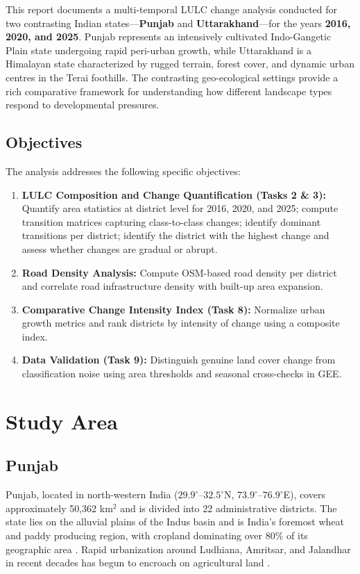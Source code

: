 \documentclass[12pt,a4paper]{article}
\begin{document}
This report documents a multi-temporal LULC change analysis conducted for two contrasting Indian states---\textbf{Punjab} and \textbf{Uttarakhand}---for the years \textbf{2016, 2020, and 2025}. Punjab represents an intensively cultivated Indo-Gangetic Plain state undergoing rapid peri-urban growth, while Uttarakhand is a Himalayan state characterized by rugged terrain, forest cover, and dynamic urban centres in the Terai foothills. The contrasting geo-ecological settings provide a rich comparative framework for understanding how different landscape types respond to developmental pressures.

\subsection{Objectives}
The analysis addresses the following specific objectives:
\begin{enumerate}[leftmargin=*, label=\arabic*.]
    \item \textbf{LULC Composition and Change Quantification (Tasks 2 \& 3):} Quantify area statistics at district level for 2016, 2020, and 2025; compute transition matrices capturing class-to-class changes; identify dominant transitions per district; identify the district with the highest change and assess whether changes are gradual or abrupt.
    \item \textbf{Road Density Analysis:} Compute OSM-based road density per district and correlate road infrastructure density with built-up area expansion.
    \item \textbf{Comparative Change Intensity Index (Task 8):} Normalize urban growth metrics and rank districts by intensity of change using a composite index.
    \item \textbf{Data Validation (Task 9):} Distinguish genuine land cover change from classification noise using area thresholds and seasonal cross-checks in GEE.
\end{enumerate}

\section{Study Area}

\subsection{Punjab}
Punjab, located in north-western India ($29.9^{\circ}$--$32.5^{\circ}$N, $73.9^{\circ}$--$76.9^{\circ}$E), covers approximately 50,362 km$^2$ and is divided into 22 administrative districts. The state lies on the alluvial plains of the Indus basin and is India's foremost wheat and paddy producing region, with cropland dominating over 80\% of its geographic area \citep{singh2004green}. Rapid urbanization around Ludhiana, Amritsar, and Jalandhar in recent decades has begun to encroach on agricultural land \citep{bhatt2020urbanization}.
\end{document}
